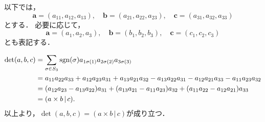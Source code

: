 





以下では，
\[
  \bm{a}=(a_{11},a_{12},a_{13}),\quad \bm{b}=(a_{21},a_{22},a_{23}),\quad \bm{c}=(a_{31},a_{32},a_{33})
\]とする．
必要に応じて，
\[
  \bm{a}=(a_1,a_2,a_3),\quad \bm{b}=(b_1,b_2,b_3) ,\quad \bm{c}=(c_1,c_2,c_3)
\]
とも表記する．


\begin{tproof}
  \begin{align*}
    \det (a,b,c) & = \sum_{\sigma \in S_3} \operatorname{sgn}(\sigma) a_{1\sigma(1)} a_{2\sigma(2)} a_{3\sigma(3)}                                                         \\
                 & = a_{11} a_{22} a_{33} + a_{12} a_{23} a_{31} + a_{13} a_{21} a_{32} - a_{13} a_{22} a_{31} - a_{12} a_{21} a_{33} - a_{11} a_{23} a_{32} \\
                 & = (a_{12} a_{23}-a_{13} a_{22})  a_{31} + (a_{13} a_{21}-a_{11} a_{23}) a_{32} + (a_{11} a_{22}-a_{12} a_{21}) a_{33}                     \\
                 & = (a \times b \, | \,  c).
  \end{align*}
  以上より，$\det (a,b,c) = (a \times b \, | \,  c)$が成り立つ．
\end{tproof}

